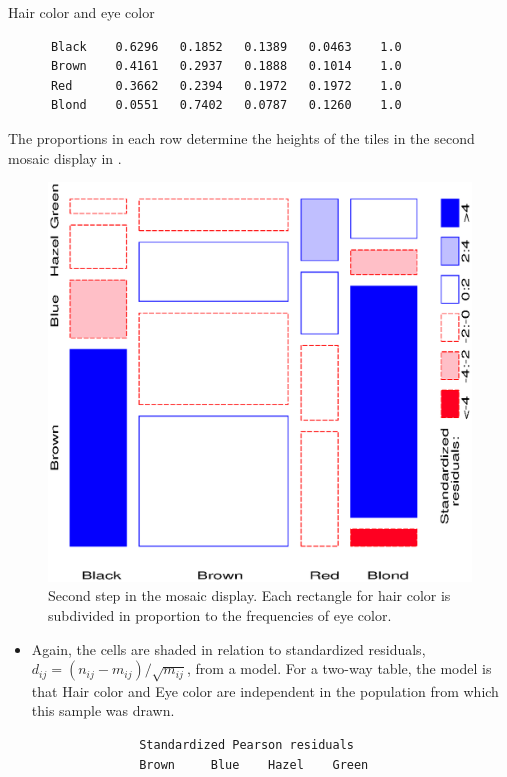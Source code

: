 \begin{Example}[haireye2a]{Hair color and eye color}
\begin{verbatim}
      Black    0.6296   0.1852   0.1389   0.0463    1.0
      Brown    0.4161   0.2937   0.1888   0.1014    1.0
      Red      0.3662   0.2394   0.1972   0.1972    1.0
      Blond    0.0551   0.7402   0.0787   0.1260    1.0
\end{verbatim}
The proportions in each row determine the heights of the tiles in the second mosaic display in .
\begin{figure}[htb]
  \centering
  \includegraphics[scale=.6]{ch4/fig/mosaic33}
  \caption[Second step in the mosaic display]{Second step in the mosaic display.  Each rectangle for hair color is subdivided in proportion to the
  frequencies of eye color.}%
  \label{fig:mosaic33}
\end{figure}

\begin{itemize}
\item Again, the cells are shaded in relation to standardized
residuals, \(d_{ij} = (
n_{ij} - m_{ij}) / \sqrt { m_{ij} }\), 
from a model.  For a two-way table, the model is that Hair color and
Eye color are independent in the population from which this sample
was drawn.
\begin{verbatim} 
               Standardized Pearson residuals
               Brown     Blue    Hazel    Green


\end{verbatim}
\end{itemize}
\end{Example}
